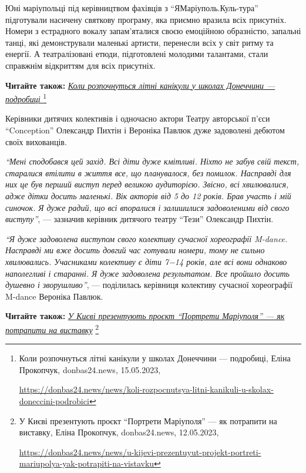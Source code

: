 Юні маріупольці під керівництвом фахівців з \enquote{ЯМаріуполь.Куль\hyp{}тура} підготували
насичену святкову програму, яка приємно вразила всіх присутніх. Номери з
естрадного вокалу запам'яталися своєю емоційною образністю, запальні танці, які
демонстрували маленькі артисти, перенесли всіх у світ ритму та енергії. А
театралізовані етюди, підготовлені молодими талантами, стали справжнім
відкриттям для всіх присутніх.

\textbf{Читайте також:} \href{https://donbas24.news/news/koli-rozpocnutsya-litni-kanikuli-u-skolax-doneccini-podrobici}{\emph{Коли розпочнуться літні канікули у школах Донеччини — подробиці }}%
\footnote{Коли розпочнуться літні канікули у школах Донеччини — подробиці, Еліна Прокопчук, donbas24.news, 15.05.2023, \par%
\url{https://donbas24.news/news/koli-rozpocnutsya-litni-kanikuli-u-skolax-doneccini-podrobici}%
}


Керівники дитячих колективів і одночасно актори Театру авторської п'єси
\enquote{Conception} Олександр Пихтін і Вероніка Павлюк дуже задоволені дебютом своїх
вихованців.

\begin{leftbar}
\emph{\enquote{Мені сподобався цей захід. Всі діти дуже кмітливі. Ніхто не забув свій
текст, старалися втілити в життя все, що планувалося, без помилок.
Насправді для них це був перший виступ перед великою аудиторією.
Звісно, всі хвилювалися, адже дітки досить маленькі. Вік акторів від 5
до 12 років. Брав участь і мій синочок. Я дуже радий, що всі впоралися
і залишилися задоволеними від свого виступу}}, — зазначив керівник
дитячого театру \enquote{Тези} Олександр Пихтін.
\end{leftbar}

\begin{leftbar}
\emph{\enquote{Я дуже задоволена виступом свого колективу сучасної хореографії M-dance.
Насправді ми вже досить довгий час готували номери, тому не сильно
хвилювались. Учасниками колективу є діти 7−14 років, але всі вони
однаково наполегливі і старанні. Я дуже задоволена результатом. Все
пройшло досить душевно і зворушливо}}, — поділилась керівниця колективу
сучасної хореографії M-dance Вероніка Павлюк.
\end{leftbar}

\textbf{Читайте також:} \href{https://donbas24.news/news/u-kijevi-prezentuyut-projekt-portreti-mariupolya-yak-potrapiti-na-vistavku}{\emph{У Києві презентують проєкт \enquote{Портрети Маріуполя} — як потрапити на виставку}}%
\footnote{У Києві презентують проєкт \enquote{Портрети Маріуполя} — як потрапити на виставку, Еліна Прокопчук, donbas24.news, 12.05.2023, \par%
\url{https://donbas24.news/news/u-kijevi-prezentuyut-projekt-portreti-mariupolya-yak-potrapiti-na-vistavku}%
}

